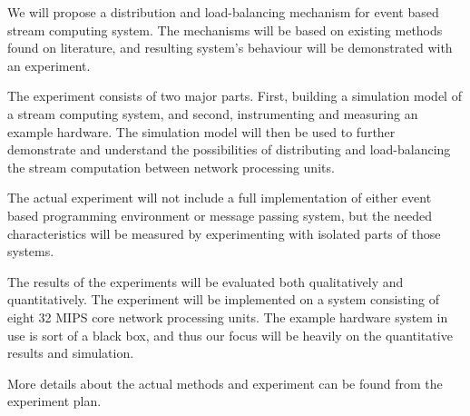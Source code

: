 We will propose a distribution and load-balancing mechanism for event based stream computing system. The mechanisms will be based on existing methods found on literature, and resulting system's behaviour will be demonstrated with an experiment.

The experiment consists of two major parts. First, building a simulation model of a stream computing system, and second, instrumenting and measuring an example hardware. The simulation model will then be used to further demonstrate and understand the possibilities of distributing and load-balancing the stream computation between network processing units.

The actual experiment will not include a full implementation of either event based programming environment or message passing system, but the needed characteristics will be measured by experimenting with isolated parts of those systems.

The results of the experiments will be evaluated both qualitatively and quantitatively. The experiment will be implemented on a system consisting of eight 32 MIPS core network processing units. The example hardware system in use is sort of a black box, and thus our focus will be heavily on the quantitative results and simulation.

More details about the actual methods and experiment can be found from the experiment plan.

